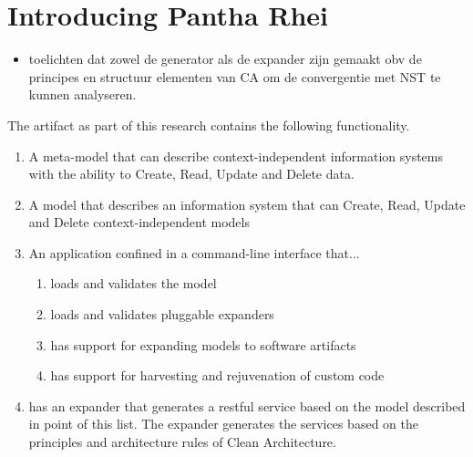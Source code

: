 \section{Introducing Pantha Rhei} \label{sec:artifact_intro}

\begin{itemize}
    \item toelichten dat zowel de generator als de expander zijn gemaakt obv de principes
    en structuur elementen van CA om de convergentie met NST te kunnen analyseren.
\end{itemize}

\renewcommand{\labelenumii}{\arabic{enumi}.\arabic{enumii}}
\renewcommand{\labelenumiii}{\arabic{enumi}.\arabic{enumii}.\arabic{enumiii}}
\renewcommand{\labelenumiv}{\arabic{enumi}.\arabic{enumii}.\arabic{enumiii}.\arabic{enumiv}}

The artifact as part of this research contains the following functionality.

\begin{enumerate}
    \item A meta-model that can describe context-independent information systems
    with the ability to Create, Read, Update and Delete data.
    \item A model that describes an information system that can Create, Read, Update and
    Delete context-independent models
    \item An application confined in a command-line interface that...
    \begin{enumerate}
        \item loads and validates the model 
        \item loads and validates pluggable expanders
        \item has support for expanding models to software artifacts
        \item has support for harvesting and rejuvenation of custom code
    \end{enumerate}
    \item has an expander that generates a restful service based on the model described
    in point of this list. The expander generates the services based on the principles
    and architecture rules of Clean Architecture.
    
\end{enumerate}